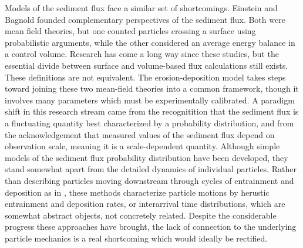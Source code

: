 Models of the sediment flux face a similar set of shortcomings.
Einstein and Bagnold founded complementary perspectives of the sediment flux. Both were mean field theories, but one counted particles crossing a surface using probabilistic arguments, while the other considered an average energy balance in a control volume.
Research has come a long way since these studies, but the essential divide between surface and volume-based flux calculations still exists. These definitions are not equivalent.
The erosion-deposition model takes steps toward joining these two mean-field theories into a common framework, though it involves many parameters which must be experimentally calibrated.
A paradigm shift in this research stream came from the recognitition that the sediment flux is a fluctuating quantity best characterized by a probability distribution, and from the acknowledgement that measured values of the sediment flux depend on observation scale, meaning it is a scale-dependent quantity.
Although simple models of the sediment flux probability distribution have been developed, they stand somewhat apart from the detailed dynamics of individual particles. Rather than describing particles moving downstream through cycles of entrainment and deposition as in \citet{Einstein1937}, these methods characterize particle motions by herustic entrainment and deposition rates, or interarrival time distributions, which are somewhat abstract objects, not concretely related.
Despite the considerable progress these approaches have brought, the lack of connection to the underlying particle mechanics is a real shortcoming which would ideally be rectified. 


